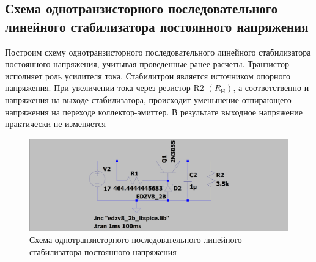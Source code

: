\documentclass[a4paper, 12pt]{article}
\begin{document}
    \subsection{Схема однотранзисторного последовательного линейного стабилизатора постоянного напряжения}
    Построим схему однотранзисторного последовательного линейного стабилизатора постоянного напряжения, учитывая проведенные ранее расчеты.
    Транзистор исполняет роль усилителя тока. Стабилитрон является источником опорного напряжения. При увеличении тока
    через резистор R2 $(R_\text{Н})$, а соответственно и напряжения на выходе стабилизатора,
    происходит уменьшение отпирающего напряжения на переходе коллектор-эмиттер.
    В результате выходное напряжение практически не изменяется
    \begin{figure}[H]
        \centering
        \includegraphics[scale=0.22]{2task_scheme_AC.png}
        \captionsetup{skip=0pt}
        \caption{Схема однотранзисторного последовательного линейного стабилизатора постоянного напряжения}
        \label{fig:2task_scheme_AC}
    \end{figure}
\end{document}
